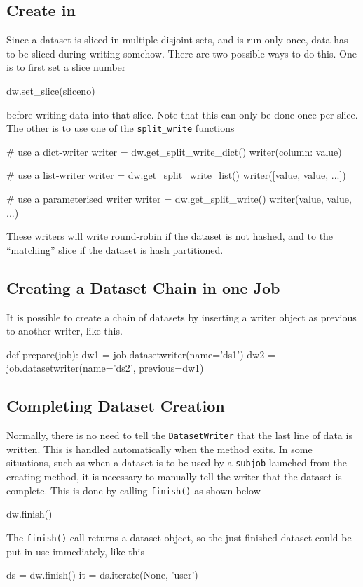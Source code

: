 \subsection{Create in \synthesis}
\label{sec:create_in_synthesis}
Since a dataset is sliced in multiple disjoint sets, and \synthesis is
run only once, data has to be sliced during writing somehow.  There
are two possible ways to do this.  One is to first set a slice number
\begin{python}
    dw.set_slice(sliceno)
\end{python}
before writing data into that slice.  Note that this can only be done
once per slice.  The other is to use one of the \texttt{split\_write}
functions
\begin{python}
    # use a dict-writer
    writer = dw.get_split_write_dict()
    writer({column: value})

    # use a list-writer
    writer = dw.get_split_write_list()
    writer([value, value, ...])

    # use a parameterised writer
    writer = dw.get_split_write()
    writer(value, value, ...)
\end{python}
These writers will write round-robin if the dataset is not hashed, and
to the ``matching'' slice if the dataset is hash partitioned.



\subsection{Creating a Dataset Chain in one Job}
It is possible to create a chain of datasets by inserting a writer
object as previous to another writer, like this.
\begin{python}
def prepare(job):
    dw1 = job.datasetwriter(name='ds1')
    dw2 = job.datasetwriter(name='ds2', previous=dw1)
\end{python}



\subsection{Completing Dataset Creation}
Normally, there is no need to tell the \texttt{DatasetWriter} that the
last line of data is written.  This is handled automatically when the
method exits.  In some situations, such as when a dataset is to be
used by a \texttt{subjob} launched from the creating method, it is
necessary to manually tell the writer that the dataset is complete.
This is done by calling \texttt{finish()} as shown below
\begin{python}
dw.finish()
\end{python}
The \texttt{finish()}-call returns a dataset object, so the just
finished dataset could be put in use immediately, like this
\begin{python}
ds = dw.finish()
it = ds.iterate(None, 'user')
\end{python}



